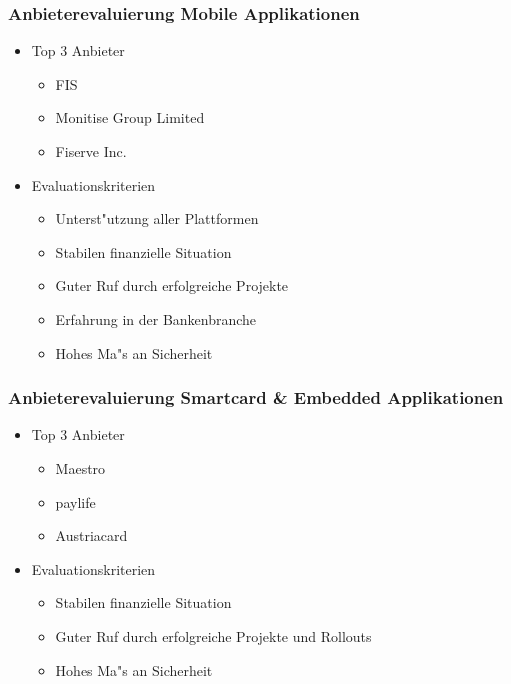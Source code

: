 \documentclass{beamer}
\begin{document}
\begin{frame}
  \frametitle{Anbieterevaluierung Mobile Applikationen}
  \begin{itemize}

	\item Top 3 Anbieter
		\begin{itemize}
			\item FIS
			\item Monitise Group Limited
			\item Fiserve Inc.\vspace{2mm}
		\end{itemize}

	\item Evaluationskriterien
		\begin{itemize}
			\item Unterst"utzung aller Plattformen
			\item Stabilen finanzielle Situation
			\item Guter Ruf durch erfolgreiche Projekte
			\item Erfahrung in der Bankenbranche
			\item Hohes Ma"s an Sicherheit
		\end{itemize}	
		
  \end{itemize}
\end{frame}

\begin{frame}
  \frametitle{Anbieterevaluierung Smartcard \& Embedded Applikationen}
  \begin{itemize}

	\item Top 3 Anbieter
		\begin{itemize}
			\item Maestro
			\item paylife
			\item Austriacard\vspace{2mm}
		\end{itemize}

	\item Evaluationskriterien
		\begin{itemize}
			\item Stabilen finanzielle Situation
			\item Guter Ruf durch erfolgreiche Projekte und Rollouts
			\item Hohes Ma"s an Sicherheit
		\end{itemize}	
		
  \end{itemize}
\end{frame}
\end{document}
